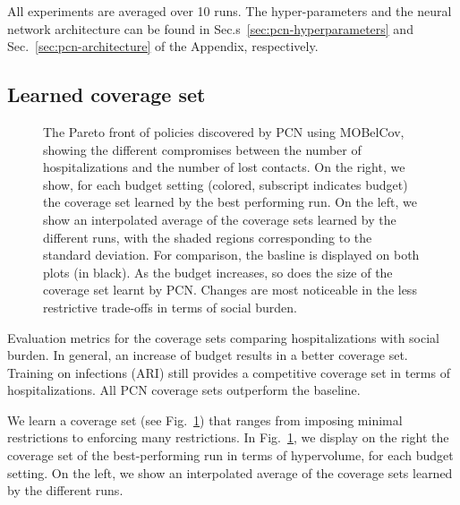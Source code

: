 \documentclass{article}
\newcommand{\momdpname}{MOBelCov}
\begin{document}
All experiments are averaged over 10 runs. The hyper-parameters and the neural network architecture can be found in Sec.s~\ref{sec:pcn-hyperparameters} and Sec.~\ref{sec:pcn-architecture} of the Appendix, respectively.


\subsection{Learned coverage set}

\begin{figure}
    \centering
    
    \caption{The Pareto front of policies discovered by PCN using \momdpname, showing the different compromises between the number of hospitalizations and the number of lost contacts. On the right, we show, for each budget setting (colored, subscript indicates budget) the coverage set learned by the best performing run. On the left, we show an interpolated average of the coverage sets learned by the different runs, with the shaded regions corresponding to the standard deviation. For comparison, the basline is displayed on both plots (in black). As the budget increases, so does the size of the coverage set learnt by PCN. Changes are most noticeable in the less restrictive trade-offs in terms of social burden.}
    \label{fig:pf-binomial-arh-budgets}
\end{figure}

\begin{table}[t]
    \centering
    \setlength{\tabcolsep}{0.5em} %
    {\renewcommand{\arraystretch}{1.2}%
    
    }
    \caption{Evaluation metrics for the coverage sets comparing hospitalizations with social burden. In general, an increase of budget results in a better coverage set. Training on infections (ARI) still provides a competitive coverage set in terms of hospitalizations. All PCN coverage sets outperform the baseline.}
    \label{tab:coverage-set}
  \end{table}

We learn a coverage set (see Fig.~\ref{fig:pf-binomial-arh-budgets}) that ranges from imposing minimal restrictions to enforcing many restrictions. In Fig.~\ref{fig:pf-binomial-arh-budgets}, we display on the right the coverage set of the best-performing run in terms of hypervolume, for each budget setting. On the left, we show an interpolated average of the coverage sets learned by the different runs.
\end{document}
